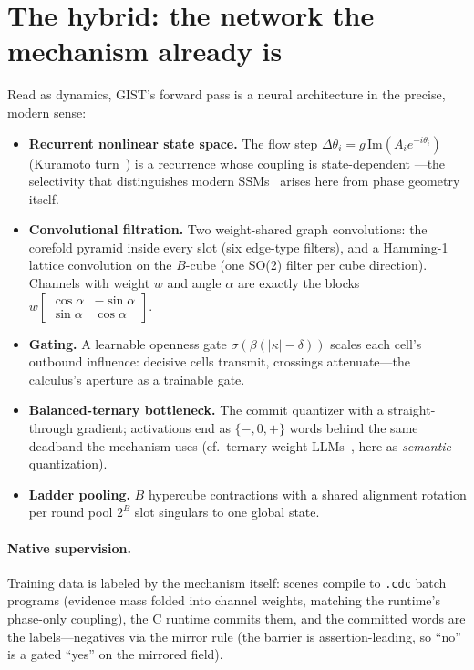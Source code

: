 \documentclass[11pt]{article}
\begin{document}
\section{The hybrid: the network the mechanism already is}

Read as dynamics, GIST's forward pass is a neural architecture in the
precise, modern sense:

\begin{itemize}
\item \textbf{Recurrent nonlinear state space.} The flow step
$\Delta\theta_i=g\,\mathrm{Im}(A_ie^{-i\theta_i})$ (Kuramoto
turn~\cite{kuramoto}) is a recurrence whose coupling is state-dependent
---the selectivity that distinguishes modern SSMs~\cite{s4,mamba} arises
here from phase geometry itself.
\item \textbf{Convolutional filtration.} Two weight-shared graph
convolutions: the corefold pyramid inside every slot (six edge-type
filters), and a Hamming-1 lattice convolution on the $B$-cube (one SO(2)
filter per cube direction). Channels with weight $w$ and angle $\alpha$
are exactly the blocks $w\!\left[\begin{smallmatrix}\cos\alpha &
-\sin\alpha\\ \sin\alpha & \cos\alpha\end{smallmatrix}\right]$.
\item \textbf{Gating.} A learnable openness gate
$\sigma(\beta(|\kappa|-\delta))$ scales each cell's outbound influence:
decisive cells transmit, crossings attenuate---the calculus's aperture as
a trainable gate.
\item \textbf{Balanced-ternary bottleneck.} The commit quantizer with a
straight-through gradient; activations end as $\{-,0,+\}$ words behind
the same deadband the mechanism uses (cf.\ ternary-weight
LLMs~\cite{bitnet}, here as \emph{semantic} quantization).
\item \textbf{Ladder pooling.} $B$ hypercube contractions with a shared
alignment rotation per round pool $2^B$ slot singulars to one global
state.
\end{itemize}

\paragraph{Native supervision.} Training data is labeled by the
mechanism itself: scenes compile to \texttt{.cdc} batch programs
(evidence mass folded into channel weights, matching the runtime's
phase-only coupling), the C runtime commits them, and the committed words
are the labels---negatives via the mirror rule (the barrier is
assertion-leading, so ``no'' is a gated ``yes'' on the mirrored field).
\end{document}
